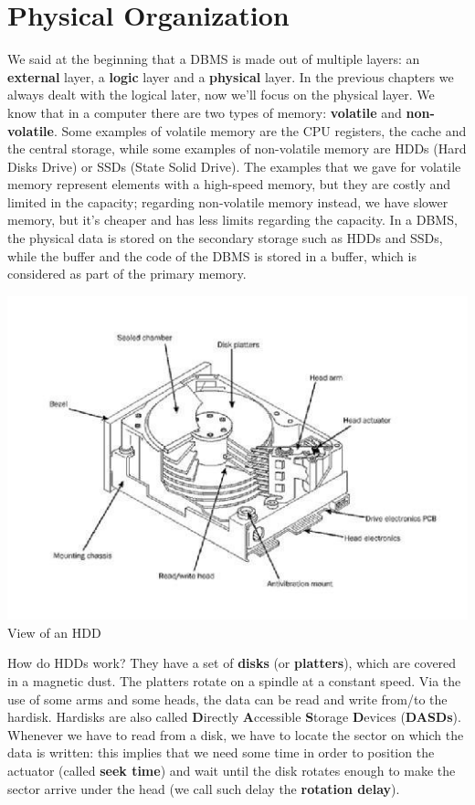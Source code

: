 \chapter{Physical Organization}

We said at the beginning that a DBMS is made out of multiple layers: an \textbf{external} layer, a \textbf{logic} layer and a \textbf{physical} layer. In the previous chapters we always dealt with the logical later, now we'll focus on the physical layer.
\nwl
We know that in a computer there are two types of memory: \textbf{volatile} and \textbf{non-volatile}. Some examples of volatile memory are the CPU registers, the cache and the central storage, while some examples of non-volatile memory are HDDs (Hard Disks Drive) or SSDs (State Solid Drive). The examples that we gave for volatile memory represent elements with a high-speed memory, but they are costly and limited in the capacity; regarding non-volatile memory instead, we have slower memory, but it's cheaper and has less limits regarding the capacity.
\nwl
In a DBMS, the physical data is stored on the secondary storage such as HDDs and SSDs, while the buffer and the code of the DBMS is stored in a buffer, which is considered as part of the primary memory.

\begin{center}
    \includegraphics[scale = 0.7]{assets/images/image1.jpg}
    \\
    View of an HDD
\end{center}

How do HDDs work? They have a set of \textbf{disks} (or \textbf{platters}), which are covered in a magnetic dust. The platters rotate on a spindle at a constant speed. Via the use of some arms and some heads, the data can be read and write from/to the hardisk. Hardisks are also called \textbf{D}irectly \textbf{A}ccessible \textbf{S}torage \textbf{D}evices (\textbf{DASDs}).
\nwl
Whenever we have to read from a disk, we have to locate the sector on which the data is written: this implies that we need some time in order to position the actuator (called \textbf{seek time}) and wait until the disk rotates enough to make the sector arrive under the head (we call such delay the \textbf{rotation delay}).

